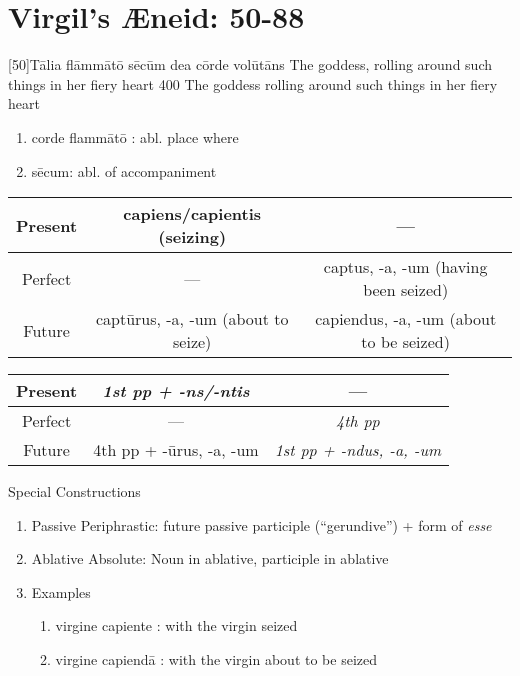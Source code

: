 \section{Virgil's {\AE}neid:  50-88} %

\latline
  {[50]T\={\macron a}l\-i\-a fl\=amm\={\macron a}t\={\macron o} s\={\macron e}c\=um d\-e\-a c\=ord\-e v\-ol\={\macron u}t\={\macron a}ns
}
  { The goddess, rolling around such things in her fiery heart }
  {400}
  { The goddess rolling around such things in her fiery heart }
  { \begin{enumerate}
  	\item corde flamm\={a}t\={o} :  abl. place where
  	\item s\={e}cum:  abl. of accompaniment
  \end{enumerate} 

	\begin{tabular}{|c|c|c|}
	\hline
	Present & capiens/capientis (seizing)    & ---                 \\
	\hline                                                
	Perfect & ---                   & captus, -a, -um (having been seized)    \\
	\hline                                                
	Future  & capt\={u}rus, -a, -um (about to seize) & capiendus, -a, -um  (about to be seized)\\
	\hline
	\end{tabular}

  \vskip 2mm
	\begin{tabular}{|c|c|c|}	
	 \hline
	 Present &  \emph{1st pp + -ns/-ntis}  & ---\\
	 \hline    
	 Perfect &  ---                        & \emph{4th pp}\\
	 \hline    
	 Future  & 4th pp + -\={u}rus, -a, -um & \emph{1st pp + -ndus, -a, -um}\\
	 \hline
	\end{tabular}
		\vskip 2mm	
	Special Constructions
	\begin{enumerate}
		\item Passive Periphrastic:  future passive participle (``gerundive'') + form of \emph{esse}
		\item Ablative Absolute:  Noun in ablative, participle in ablative
		\item Examples
			\begin{enumerate}
				\item virgine capiente : with the virgin seized
				\item virgine capiend\={a} : with the virgin about to be seized
			\end{enumerate}
	\end{enumerate}
	
}
